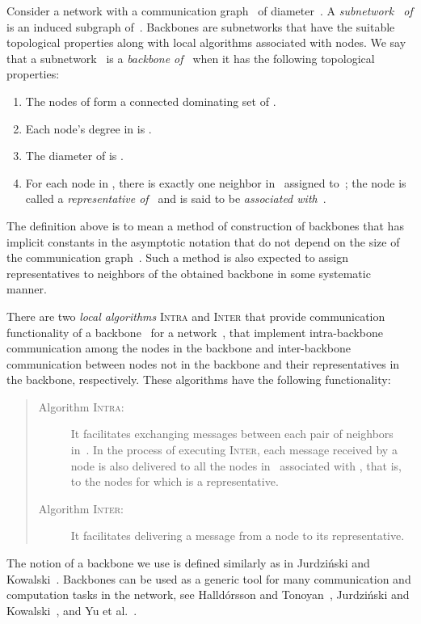 \documentclass[11pt]{article}
\newcommand{\FF}{\vspace*{\medskipamount}}
\begin{document}
Consider a network with a communication graph~ of diameter~.
A \emph{subnetwork~ of } is an induced subgraph of~.
Backbones are subnetworks that have the suitable topological properties along with local algorithms associated with nodes.
We say that a subnetwork~ is a \emph{backbone of~} when it has the following topological properties:
\begin{enumerate}
\item
The nodes of  form a connected dominating set of .
\item
Each node's degree in  is .
\item
The diameter of  is .
\item
For each node  in , there is exactly one neighbor  in~  assigned to~; the node  is called a \emph{representative of~} and  is said to be \emph{associated with~}.
\end{enumerate}
The definition above  is to mean a method of construction of backbones that has implicit constants in the asymptotic notation that do not depend on the size of the communication graph~.
Such a method is also expected to assign representatives to neighbors of the obtained backbone in some systematic manner.

There are two \emph{local algorithms} \textsc{Intra} and \textsc{Inter} that provide communication functionality of a backbone~ for a network~, that implement intra-backbone communication among the nodes in the backbone and inter-backbone communication between nodes not in the backbone and their representatives in the backbone, respectively.
These  algorithms have the following functionality:
\begin{quote}
\begin{description}
\item[\rm Algorithm \textsc{Intra}:] 
It facilitates exchanging messages between each pair of neighbors in~. 
In the process of executing \textsc{Inter}, each message received by a node  is also delivered to all the nodes in~ associated with , that is, to the nodes for which  is a representative.
\FF
\item[\rm Algorithm \textsc{Inter}:]  
It  facilitates delivering a message from a node to its representative.
\end{description}
\end{quote}
The notion of a backbone we use is defined similarly as in Jurdzi{\'n}ski and Kowalski~\cite{JK-DISC12}. 
Backbones can be used as a generic tool for many communication and computation tasks in the network, see Halld{\'{o}}rsson and Tonoyan~\cite{HalldorssonT21}, Jurdzi{\'n}ski and Kowalski~\cite{JK-DISC12},  and Yu et al.~\cite{YuWWY2013}.
\end{document}
